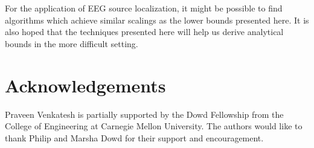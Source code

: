 \documentclass[conference]{IEEEtran}
\begin{document}
For the application of EEG source localization, it might be possible to find
algorithms which achieve similar scalings as the lower bounds presented here.
It is also hoped that the techniques presented here will help us derive
analytical bounds in the more difficult setting.

\section*{Acknowledgements}

Praveen Venkatesh is partially supported by the Dowd Fellowship from the
College of Engineering at Carnegie Mellon University. The authors would like to
thank Philip and Marsha Dowd for their support and encouragement.




\end{document}
